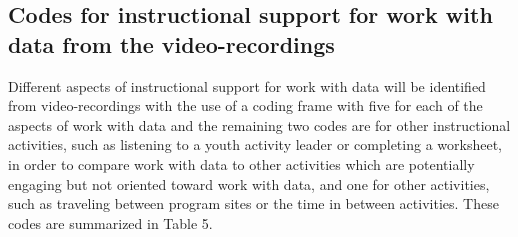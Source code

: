 \documentclass[]{msu-thesis}
\theoremstyle{definition}
\theoremstyle{definition}
\theoremstyle{definition}
\theoremstyle{remark}
\begin{document}
\subsection{Codes for instructional support for work with data from the
video-recordings}\label{codes-for-instructional-support-for-work-with-data-from-the-video-recordings}

Different aspects of instructional support for work with data will be
identified from video-recordings with the use of a coding frame with
five for each of the aspects of work with data and the remaining two
codes are for other instructional activities, such as listening to a
youth activity leader or completing a worksheet, in order to compare
work with data to other activities which are potentially engaging but
not oriented toward work with data, and one for other activities, such
as traveling between program sites or the time in between activities.
These codes are summarized in Table 5.
\end{document}
